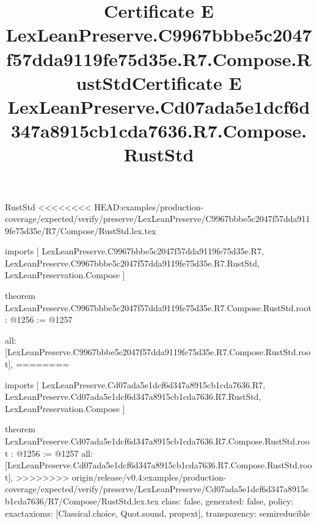 \begin{lexlean}{RustStd}
<<<<<<<< HEAD:examples/production-coverage/expected/verify/preserve/LexLeanPreserve/C9967bbbe5c2047f57dda9119fe75d35e/R7/Compose/RustStd.lex.tex
\title{Certificate E LexLeanPreserve.C9967bbbe5c2047f57dda9119fe75d35e.R7.Compose.RustStd}
\begin{coremodule}
imports [
  LexLeanPreserve.C9967bbbe5c2047f57dda9119fe75d35e.R7,
  LexLeanPreserve.C9967bbbe5c2047f57dda9119fe75d35e.R7.RustStd,
  LexLeanPreservation.Compose
]

theorem LexLeanPreserve.C9967bbbe5c2047f57dda9119fe75d35e.R7.Compose.RustStd.root : @1256 := @1257 {
  all: [LexLeanPreserve.C9967bbbe5c2047f57dda9119fe75d35e.R7.Compose.RustStd.root],
========
\title{Certificate E LexLeanPreserve.Cd07ada5e1dcf6d347a8915cb1cda7636.R7.Compose.RustStd}
\begin{coremodule}
imports [
  LexLeanPreserve.Cd07ada5e1dcf6d347a8915cb1cda7636.R7,
  LexLeanPreserve.Cd07ada5e1dcf6d347a8915cb1cda7636.R7.RustStd,
  LexLeanPreservation.Compose
]

theorem LexLeanPreserve.Cd07ada5e1dcf6d347a8915cb1cda7636.R7.Compose.RustStd.root : @1256 := @1257 {
  all: [LexLeanPreserve.Cd07ada5e1dcf6d347a8915cb1cda7636.R7.Compose.RustStd.root],
>>>>>>>> origin/release/v0.4:examples/production-coverage/expected/verify/preserve/LexLeanPreserve/Cd07ada5e1dcf6d347a8915cb1cda7636/R7/Compose/RustStd.lex.tex
  class: false,
  generated: false,
  policy: exact{axioms: [Classical.choice, Quot.sound, propext]},
  transparency: semireducible
}


\end{coremodule}}
\end{coremodule}
\end{lexlean}
